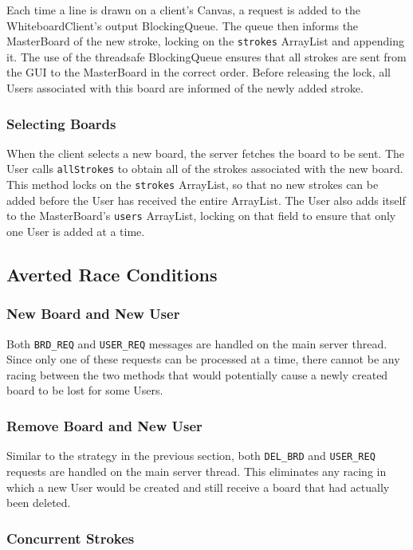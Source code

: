 Each time a line is drawn on a client's Canvas, a request is added to the WhiteboardClient's output BlockingQueue. The queue then informs the MasterBoard of the new stroke, locking on the \texttt{strokes} ArrayList and appending it. The use of the threadsafe BlockingQueue ensures that all strokes are sent from the GUI to the MasterBoard in the correct order. Before releasing the lock, all Users associated with this board are informed of the newly added stroke.

\subsubsection{Selecting Boards}

When the client selects a new board, the server fetches the board to be sent. The User calls \texttt{allStrokes} to obtain all of the strokes associated with the new board. This method locks on the \texttt{strokes} ArrayList, so that no new strokes can be added before the User has received the entire ArrayList. The User also adds itself to the MasterBoard's \texttt{users} ArrayList, locking on that field to ensure that only one User is added at a time.

\subsection{Averted Race Conditions}

\subsubsection{New Board and New User}

Both \texttt{BRD\_REQ} and \texttt{USER\_REQ} messages are handled on the main server thread. Since only one of these requests can be processed at a time, there cannot be any racing between the two methods that would potentially cause a newly created board to be lost for some Users. 

\subsubsection{Remove Board and New User}

Similar to the strategy in the previous section, both \texttt{DEL\_BRD} and \texttt{USER\_REQ} requests are handled on the main server thread. This eliminates any racing in which a new User would be created and still receive a board that had actually been deleted.

\subsubsection{Concurrent Strokes}

